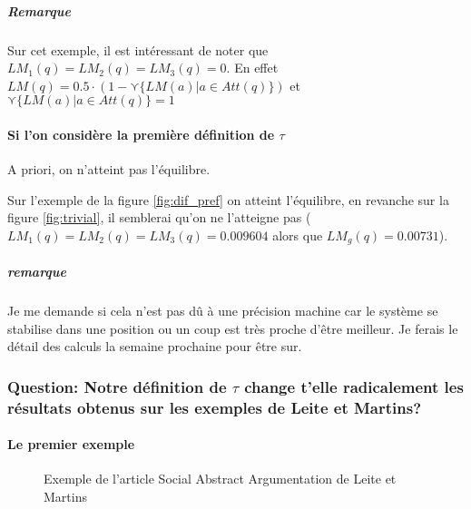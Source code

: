 \documentclass[12pt]{article}
\theoremstyle{defi}
\theoremstyle{not}
\theoremstyle{prob}
\begin{document}
\subparagraph{Remarque\\}
Sur cet exemple, il est intéressant de noter que $LM_1(q) = LM_2(q) = LM_3(q) = 0$. En effet $LM(q) = 0.5 \cdot (1 - \curlyvee \{LM(a) | a\in Att(q)\})$ et $\curlyvee \{LM(a) | a\in Att(q)\} = 1$


\paragraph{Si l'on considère la première définition de $\tau$\\}
A priori, on n'atteint pas l'équilibre.

Sur l'exemple de la figure \ref{fig:dif_pref} on atteint l'équilibre, en revanche sur la figure \ref{fig:trivial}, il semblerai qu'on ne l'atteigne pas ($LM_1(q) = LM_2(q) = LM_3(q) = 0.009604$ alors que $LM_g(q) = 0.00731$).

\subparagraph{remarque\\} Je me demande si cela n'est pas dû à une précision machine car le système se stabilise dans une position ou un coup est très proche d'être meilleur. Je ferais le détail des calculs la semaine prochaine pour être sur.

\subsubsection{Question: Notre définition de $\tau$ change t'elle radicalement les résultats obtenus sur les exemples de Leite et Martins?}

\paragraph{Le premier exemple\\}

\begin{figure}
\centering
{}
\caption{Exemple de l'article Social Abstract Argumentation de Leite et Martins}
\label{fig:LM_example}
\end{figure}
\end{document}
